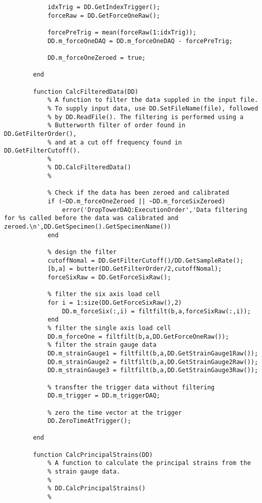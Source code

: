 \begin{lstlisting}
            idxTrig = DD.GetIndexTrigger();
            forceRaw = DD.GetForceOneRaw();
            
            forcePreTrig = mean(forceRaw(1:idxTrig));
            DD.m_forceOneDAQ = DD.m_forceOneDAQ - forcePreTrig;
            
            DD.m_forceOneZeroed = true;
            
        end
                
        function CalcFilteredData(DD)
            % A function to filter the data suppled in the input file.
            % To supply input data, use DD.SetFileName(file), followed
            % by DD.ReadFile(). The filtering is performed using a
            % Butterworth filter of order found in DD.GetFilterOrder(),
            % and at a cut off frequency found in DD.GetFilterCutoff().
            %
            % DD.CalcFilteredData()
            %
            
            % Check if the data has been zeroed and calibrated
            if (~DD.m_forceOneZeroed || ~DD.m_forceSixZeroed)
                error('DropTowerDAQ:ExecutionOrder','Data filtering for %s called before the data was calibrated and zeroed.\n',DD.GetSpecimen().GetSpecimenName())
            end
                        
            % design the filter
            cutoffNomal = DD.GetFilterCutoff()/DD.GetSampleRate();
            [b,a] = butter(DD.GetFilterOrder/2,cutoffNomal);
            forceSixRaw = DD.GetForceSixRaw();
            
            % filter the six axis load cell
            for i = 1:size(DD.GetForceSixRaw(),2)
                DD.m_forceSix(:,i) = filtfilt(b,a,forceSixRaw(:,i));
            end
            % filter the single axis load cell
            DD.m_forceOne = filtfilt(b,a,DD.GetForceOneRaw());            
            % filter the strain gauge data
            DD.m_strainGauge1 = filtfilt(b,a,DD.GetStrainGauge1Raw());
            DD.m_strainGauge2 = filtfilt(b,a,DD.GetStrainGauge2Raw());
            DD.m_strainGauge3 = filtfilt(b,a,DD.GetStrainGauge3Raw());
            
            % transfter the trigger data without filtering
            DD.m_trigger = DD.m_triggerDAQ;
            
            % zero the time vector at the trigger
            DD.ZeroTimeAtTrigger();
            
        end
        
        function CalcPrincipalStrains(DD)
            % A function to calculate the principal strains from the
            % strain gauge data.
            %
            % DD.CalcPrincipalStrains()
            %
            

\end{lstlisting}
